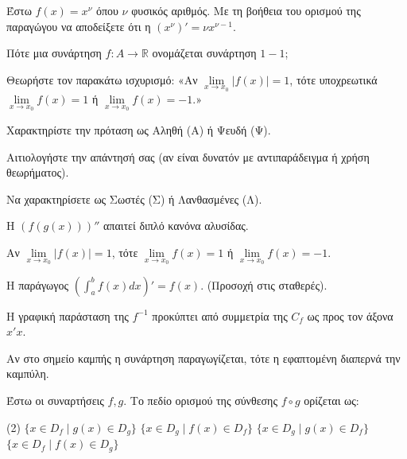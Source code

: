 \documentclass[11pt,a4paper]{article}
\newcommand{\kerkissans}[1]{{\fontfamily{maksf}\selectfont \textbf{#1}}}
\renewcommand{\textdexiakeraia}{}
\newcommand{\dint}{\displaystyle\int}
\newcommand\themanum{A}
\newcounter{thema}[section]
\renewcommand{\thethema}{\arabic{thema}}
\newcommand{\Thema}{\refstepcounter{thema}{\textbf{\textcolor{black}{\faPenSquare\ \  \large \kerkissans{\textbf{\thethemaο\hspace{2mm}Διαγώνισμα - Θέμα \themanum}}}}}\hspace{0mm}}{}
\newenvironment{thema}[1]
{\begin{tcolorbox}[title=\Thema\kerkissans{\textbf{\large{  #1}}},breakable,
enhanced standard,titlerule=0pt,toprule=0pt, rightrule=0pt, bottomrule=0pt,
colback=white,left=0mm,top=1mm,bottom=0mm,
boxrule=0pt,
colframe=white,leftrule=0mm,sharp corners,coltitle=black]
\renewcommand{\themanum}{#1}}
{\end{tcolorbox}}
\begin{document}
\begin{thema}{A}
\begin{erwthma}
    \item Έστω $f(x) = x^\nu$ όπου $\nu$ φυσικός αριθμός. Με τη βοήθεια του ορισμού της παραγώγου να αποδείξετε ότι η $(x^\nu)' = \nu x^{\nu - 1}$.
    \item Πότε μια συνάρτηση $f:A\to\mathbb{R}$ ονομάζεται συνάρτηση $1-1$;
    \item Θεωρήστε τον παρακάτω ισχυρισμό:
    «Αν $\lim\limits_{x\to x_0}|f(x)| = 1$, τότε υποχρεωτικά $\lim\limits_{x\to x_0}f(x) = 1$ ή $\lim\limits_{x\to x_0}f(x) = -1$.»
    \begin{alist}
    \item Χαρακτηρίστε την πρόταση ως Αληθή (Α) ή Ψευδή (Ψ).
    \item Αιτιολογήστε την απάντησή σας (αν είναι δυνατόν με αντιπαράδειγμα ή χρήση θεωρήματος).
    \end{alist}
    \item Να χαρακτηρίσετε ως Σωστές (Σ) ή Λανθασμένες (Λ).
    \begin{alist}
        \item H $(f(g(x)))''$ απαιτεί διπλό κανόνα αλυσίδας.
        \item Αν $\lim\limits_{x\to x_0} |f(x)| = 1$, τότε $\lim\limits_{x\to x_0} f(x) = 1$ ή $\lim\limits_{x\to x_0} f(x) = -1$.
        \item Η παράγωγος $\left(\dint_a^b f(x) dx \right)' = f(x)$. (Προσοχή στις σταθερές).
        \item Η γραφική παράσταση της $f^{-1}$ προκύπτει από συμμετρία της $C_f$ ως προς τον άξονα $x'x$.
        \item Αν στο σημείο καμπής η συνάρτηση παραγωγίζεται, τότε η εφαπτομένη διαπερνά την καμπύλη.
    \end{alist}
    \item Έστω οι συναρτήσεις $f, g$. Το πεδίο ορισμού της σύνθεσης $f \circ g$ ορίζεται ως:
    \begin{tasks}[label=\let\textdexiakeraia\relax\alph*.](2)
        \task $\big\{x \in D_f \mid g(x) \in D_g\big\}$
        \task $\big\{x \in D_g \mid f(x) \in D_f\big\}$
        \task $\big\{x \in D_g \mid g(x) \in D_f\big\}$
        \task $\big\{x \in D_f \mid f(x) \in D_g\big\}$
    \end{tasks}
\end{erwthma}
\end{thema}
\vspace{1cm}
\end{document}
